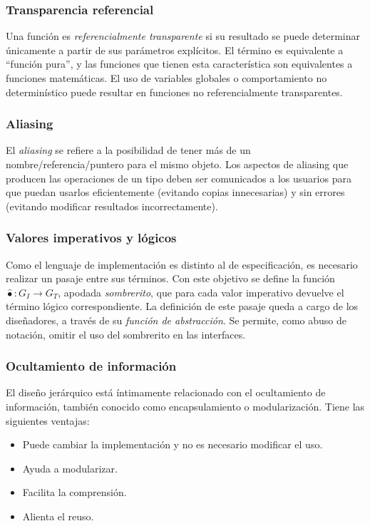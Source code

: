 \documentclass{article}
\begin{document}
\subsubsection{Transparencia referencial}

Una función es \textit{referencialmente transparente} si su resultado se puede determinar únicamente a partir de sus parámetros explícitos. El término es equivalente a ``función pura'', y las funciones que tienen esta característica son equivalentes a funciones matemáticas.  El uso de variables globales o comportamiento no determinístico puede resultar en funciones no referencialmente transparentes.

\subsubsection{Aliasing}

El \textit{aliasing} se refiere a la posibilidad de tener más de un nombre/referencia/puntero para el mismo objeto. Los aspectos de aliasing que producen las operaciones de un tipo deben ser comunicados a los usuarios para que puedan usarlos eficientemente (evitando copias innecesarias) y sin errores (evitando modificar resultados incorrectamente).

\subsubsection{Valores imperativos y lógicos}

Como el lenguaje de implementación es distinto al de especificación, es necesario realizar un pasaje entre sus términos. Con este objetivo se define la función $\hat{\bullet}: G_I \rightarrow G_T$, apodada \textit{sombrerito}, que para cada valor imperativo devuelve el término lógico correspondiente. La definición de este pasaje queda a cargo de los diseñadores, a través de su \textit{función de abstracción}. Se permite, como abuso de notación, omitir el uso del sombrerito en las interfaces.

\subsubsection{Ocultamiento de información}

El diseño jerárquico está íntimamente relacionado con el ocultamiento de información, también conocido como encapsulamiento o modularización. Tiene las siguientes ventajas:

\begin{itemize}
    \item Puede cambiar la implementación y no es necesario modificar el uso.
    \item Ayuda a modularizar.
    \item Facilita la comprensión.
    \item Alienta el reuso.
\end{itemize}
\end{document}

